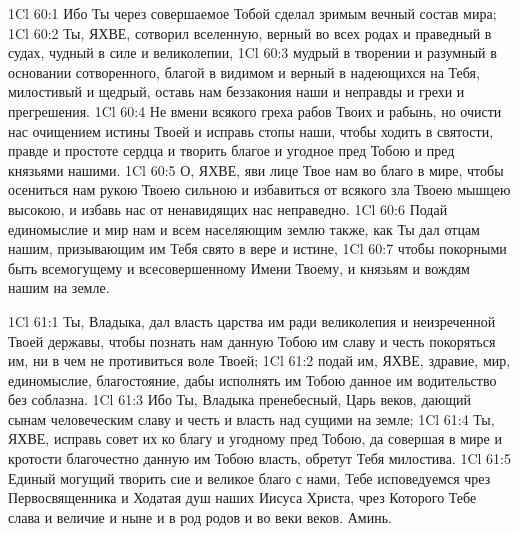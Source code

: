 \vs 1Cl 60:1
Ибо Ты через совершаемое
Тобой сделал зримым вечный состав мира;
\vs 1Cl 60:2
Ты, ЯХВЕ, сотворил
вселенную, верный во всех родах и праведный в судах, чудный в силе и
великолепии,
\vs 1Cl 60:3
мудрый в творении и
разумный в основании сотворенного, благой в видимом и верный в надеющихся на
Тебя, милостивый и щедрый, оставь нам беззакония наши и неправды и грехи и
прегрешения.
\vs 1Cl 60:4
Не вмени всякого греха
рабов Твоих и рабынь, но очисти нас очищением истины Твоей и исправь стопы
наши, чтобы ходить в святости, правде и простоте сердца и творить благое и
угодное пред Тобою и пред князьями нашими.
\vs 1Cl 60:5
О, ЯХВЕ, яви лице Твое нам
во благо в мире, чтобы осениться нам рукою Твоею сильною и избавиться от
всякого зла Твоею мышцею высокою, и избавь нас от ненавидящих нас неправедно.
\vs 1Cl 60:6
Подай единомыслие и мир
нам и всем населяющим землю также, как Ты дал отцам нашим, призывающим им Тебя
свято в вере и истине,
\vs 1Cl 60:7
чтобы покорными быть
всемогущему и всесовершенному Имени Твоему, и князьям и вождям нашим на земле.

\vs 1Cl 61:1
Ты, Владыка, дал власть
царства им ради великолепия и неизреченной Твоей державы, чтобы познать нам
данную Тобою им славу и честь покоряться им, ни в чем не противиться воле
Твоей;
\vs 1Cl 61:2
подай им, ЯХВЕ, здравие,
мир, единомыслие, благостояние, дабы исполнять им Тобою данное им водительство
без соблазна.
\vs 1Cl 61:3
Ибо Ты, Владыка
пренебесный, Царь веков, дающий сынам человеческим славу и честь и власть над
сущими на земле;
\vs 1Cl 61:4
Ты, ЯХВЕ, исправь совет их
ко благу и угодному пред Тобою, да совершая в мире и кротости благочестно
данную им Тобою власть, обретут Тебя милостива.
\vs 1Cl 61:5
Единый могущий творить сие
и великое благо с нами, Тебе исповедуемся чрез Первосвященника и Ходатая душ
наших Иисуса Христа, чрез Которого Тебе слава и величие и ныне и в род родов
и во веки веков. Аминь.

